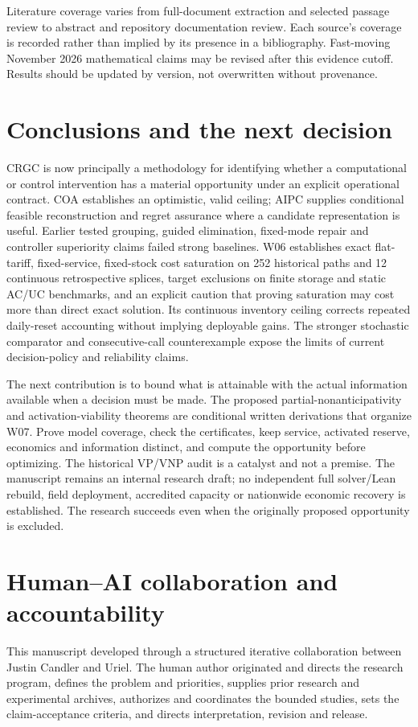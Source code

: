\documentclass[11pt,letterpaper]{article}
\begin{document}
Literature coverage varies from full-document extraction and selected passage review to abstract and repository documentation review. Each source's coverage is recorded rather than implied by its presence in a bibliography. Fast-moving November 2026 mathematical claims may be revised after this evidence cutoff. Results should be updated by version, not overwritten without provenance.

\section{Conclusions and the next decision}
CRGC is now principally a methodology for identifying whether a computational or control intervention has a material opportunity under an explicit operational contract. COA establishes an optimistic, valid ceiling; AIPC supplies conditional feasible reconstruction and regret assurance where a candidate representation is useful. Earlier tested grouping, guided elimination, fixed-mode repair and controller superiority claims failed strong baselines. W06 establishes exact flat-tariff, fixed-service, fixed-stock cost saturation on 252 historical paths and 12 continuous retrospective splices, target exclusions on finite storage and static AC/UC benchmarks, and an explicit caution that proving saturation may cost more than direct exact solution. Its continuous inventory ceiling corrects repeated daily-reset accounting without implying deployable gains. The stronger stochastic comparator and consecutive-call counterexample expose the limits of current decision-policy and reliability claims.

The next contribution is to bound what is attainable with the actual information available when a decision must be made. The proposed partial-nonanticipativity and activation-viability theorems are conditional written derivations that organize W07. Prove model coverage, check the certificates, keep service, activated reserve, economics and information distinct, and compute the opportunity before optimizing. The historical VP/VNP audit is a catalyst and not a premise. The manuscript remains an internal research draft; no independent full solver/Lean rebuild, field deployment, accredited capacity or nationwide economic recovery is established. The research succeeds even when the originally proposed opportunity is excluded.

\section*{Human--AI collaboration and accountability}
This manuscript developed through a structured iterative collaboration between Justin Candler and Uriel. The human author originated and directs the research program, defines the problem and priorities, supplies prior research and experimental archives, authorizes and coordinates the bounded studies, sets the claim-acceptance criteria, and directs interpretation, revision and release.
\end{document}

